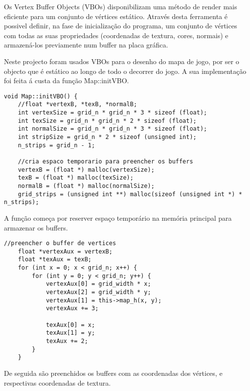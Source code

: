 Os Vertex Buffer Objects (VBOs) disponibilizam uma método de render mais eficiente para um conjunto de vértices estático. Através desta ferramenta é possivel definir, na fase de inicialização do programa, um conjunto de vértices com todas as suas propriedades (coordenadas de textura, cores, normais) e armazená-los previamente num buffer na placa gráfica.

Neste projecto foram usados VBOs para o desenho do mapa de jogo, por ser o objecto que é estático ao longo de todo o decorrer do jogo. A sua implementação foi feita á custa da função Map::initVBO.

\begin{lstlisting}[caption=Cálculo dos buffers para VBOs (alocação)]
void Map::initVBO() {
	//float *vertexB, *texB, *normalB;
	int vertexSize = grid_n * grid_n * 3 * sizeof (float);
	int texSize = grid_n * grid_n * 2 * sizeof (float);
	int normalSize = grid_n * grid_n * 3 * sizeof (float);
	int stripSize = grid_n * 2 * sizeof (unsigned int);
	n_strips = grid_n - 1;

	//cria espaco temporario para preencher os buffers
	vertexB = (float *) malloc(vertexSize);
	texB = (float *) malloc(texSize);
	normalB = (float *) malloc(normalSize);
	grid_strips = (unsigned int **) malloc(sizeof (unsigned int *) * n_strips);
\end{lstlisting}
A função começa por reserver espaço temporário na memória principal para armazenar os buffers.

\begin{lstlisting}[caption=Cálculo dos buffers para VBOs (vértices)]
	//preencher o buffer de vertices
	float *vertexAux = vertexB;
	float *texAux = texB;
	for (int x = 0; x < grid_n; x++) {
		for (int y = 0; y < grid_n; y++) {
			vertexAux[0] = grid_width * x;
			vertexAux[2] = grid_width * y;
			vertexAux[1] = this->map_h(x, y);
			vertexAux += 3;

			texAux[0] = x;
			texAux[1] = y;
			texAux += 2;
		}
	}
\end{lstlisting}
De seguida são preenchidos os buffers com as coordenadas dos vértices, e respectivas coordenadas de textura.

